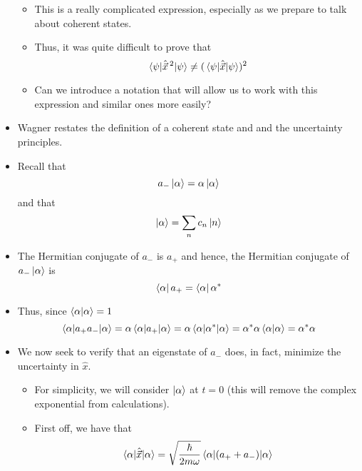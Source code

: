 \documentclass[../notes.tex]{subfiles}
\begin{document}
\begin{itemize}
\begin{equation*}
    \end{equation*}
    \begin{itemize}
        \item This is a really complicated expression, especially as we prepare to talk about coherent states.
        \item Thus, it was quite difficult to prove that
        \begin{equation*}
            \ev{\hat{\vec{x}}{\,}^2}{\psi} \neq (\ev{\hat{\vec{x}}}{\psi})^2
        \end{equation*}
        \item Can we introduce a notation that will allow us to work with this expression and similar ones more easily?
    \end{itemize}
    \item Wagner restates the definition of a coherent state and and the uncertainty principles.
    \item Recall that
    \begin{equation*}
        a_-\ket{\alpha} = \alpha\ket{\alpha}
    \end{equation*}
    and that
    \begin{equation*}
        \ket{\alpha} = \sum_nc_n\ket{n}
    \end{equation*}
    \item The Hermitian conjugate of $a_-$ is $a_+$ and hence, the Hermitian conjugate of $a_-\ket{\alpha}$ is
    \begin{equation*}
        \bra{\alpha}a_+ = \bra{\alpha}\alpha^*
    \end{equation*}
    \item Thus, since $\braket{\alpha}=1$
    \begin{equation*}
        \ev{a_+a_-}{\alpha} = \alpha\ev{a_+}{\alpha}
        = \alpha\ev{\alpha^*}{\alpha}
        = \alpha^*\alpha\braket{\alpha}
        = \alpha^*\alpha
    \end{equation*}
    \item We now seek to verify that an eigenstate of $a_-$ does, in fact, minimize the uncertainty in $\hat{x}$.
    \begin{itemize}
        \item For simplicity, we will consider $\ket{\alpha}$ at $t=0$ (this will remove the complex exponential from calculations).
        \item First off, we have that
        \begin{equation*}
            \ev{\hat{\vec{x}}}{\alpha} = \sqrt{\frac{\hbar}{2m\omega}}\ev{(a_++a_-)}{\alpha}

\end{equation*}
\end{itemize}
\end{itemize}
\end{document}
